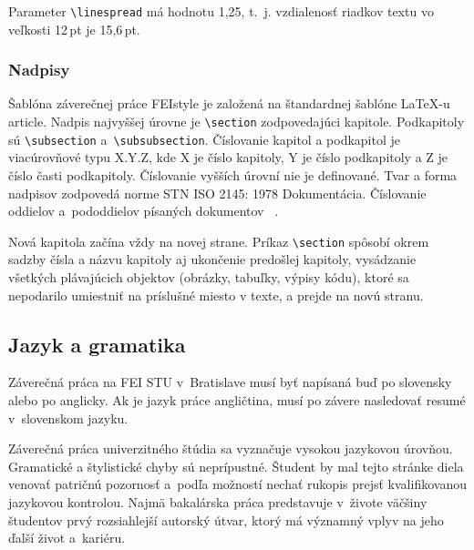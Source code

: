 Parameter \verb|\linespread| má hodnotu 1,25, t.~j.
vzdialenosť riadkov textu vo veľkosti 12\,pt je 15,6\,pt.

\subsubsection*{Nadpisy}
Šablóna záverečnej práce FEIstyle je založená na
štandardnej šablóne \LaTeX-u article.
Nadpis najvyššej úrovne je \verb|\section| zodpovedajúci kapitole.
Podkapitoly sú \verb|\subsection| a~\verb|\subsubsection|.
Číslovanie kapitol a podkapitol je viacúrovňové typu X.Y.Z, kde X je číslo kapitoly, Y je číslo podkapitoly a Z je číslo časti podkapitoly.
Číslovanie vyšších úrovní nie je definované.
Tvar a forma nadpisov zodpovedá norme STN ISO 2145: 1978 Dokumentácia.
Číslovanie oddielov a~pododdielov písaných dokumentov ~\cite{iso2145}.

Nová kapitola začína vždy na novej strane.
Príkaz \verb|\section| spôsobí okrem sadzby čísla a názvu kapitoly aj ukončenie predošlej kapitoly, vysádzanie všetkých plávajúcich objektov (obrázky, tabuľky, výpisy kódu), ktoré sa nepodarilo umiestniť na príslušné miesto v texte, a prejde na novú stranu.

\subsection{Jazyk a gramatika}
Záverečná práca na FEI STU v~Bratislave musí byť napísaná
buď po slovensky alebo po anglicky.
Ak je jazyk práce angličtina, musí po závere nasledovať
resumé v~slovenskom jazyku.

Záverečná práca univerzitného štúdia sa vyznačuje
vysokou jazykovou úrovňou.
Gramatické a štylistické chyby sú neprípustné.
Študent by mal tejto stránke diela venovať patričnú
pozornosť a~podľa možností nechať rukopis prejsť
kvalifikovanou jazykovou kontrolou.
Najmä bakalárska práca predstavuje v~živote väčšiny študentov 
prvý rozsiahlejší autorský útvar,
ktorý má významný vplyv na jeho ďalší život a~kariéru.

